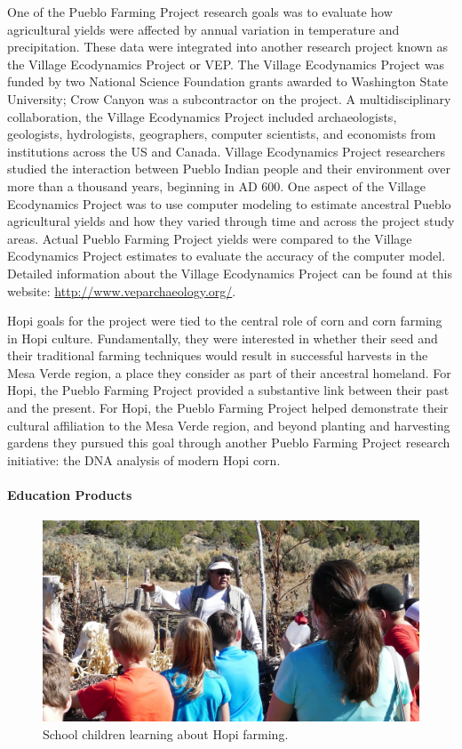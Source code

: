 \documentclass[12pt,]{article}
\let\oldparagraph\paragraph
\renewcommand{\paragraph}[1]{\oldparagraph{#1}\mbox{}}
\begin{document}
One of the Pueblo Farming Project research goals was to evaluate how agricultural yields were affected by annual variation in temperature and precipitation. These data were integrated into another research project known as the Village Ecodynamics Project or VEP. The Village Ecodynamics Project was funded by two National Science Foundation grants awarded to Washington State University; Crow Canyon was a subcontractor on the project. A multidisciplinary collaboration, the Village Ecodynamics Project included archaeologists, geologists, hydrologists, geographers, computer scientists, and economists from institutions across the US and Canada. Village Ecodynamics Project researchers studied the interaction between Pueblo Indian people and their environment over more than a thousand years, beginning in AD 600. One aspect of the Village Ecodynamics Project was to use computer modeling to estimate ancestral Pueblo agricultural yields and how they varied through time and across the project study areas. Actual Pueblo Farming Project yields were compared to the Village Ecodynamics Project estimates to evaluate the accuracy of the computer model. Detailed information about the Village Ecodynamics Project can be found at this website: \url{http://www.veparchaeology.org/}.

Hopi goals for the project were tied to the central role of corn and corn farming in Hopi culture. Fundamentally, they were interested in whether their seed and their traditional farming techniques would result in successful harvests in the Mesa Verde region, a place they consider as part of their ancestral homeland. For Hopi, the Pueblo Farming Project provided a substantive link between their past and the present. For Hopi, the Pueblo Farming Project helped demonstrate their cultural affiliation to the Mesa Verde region, and beyond planting and harvesting gardens they pursued this goal through another Pueblo Farming Project research initiative: the DNA analysis of modern Hopi corn.

\hypertarget{education-products}{%
\paragraph{Education Products}\label{education-products}}

\begin{figure}
\centering
\includegraphics{./images/children.jpg}
\caption{School children learning about Hopi farming.}
\end{figure}
\end{document}
